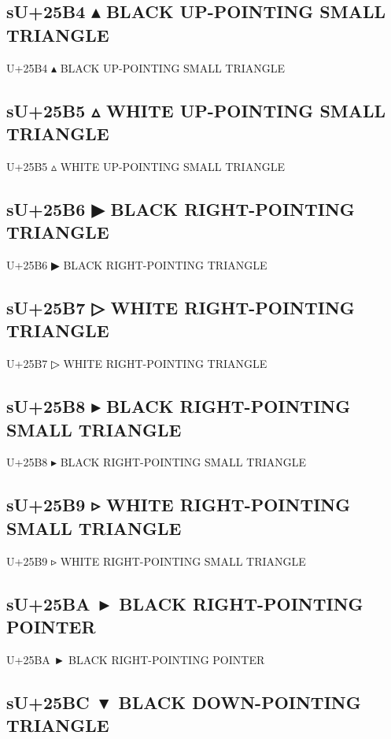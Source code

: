 \subsection{sU+25B4 ▴ BLACK UP-POINTING SMALL TRIANGLE}

U+25B4 ▴ BLACK UP-POINTING SMALL TRIANGLE

\subsection{sU+25B5 ▵ WHITE UP-POINTING SMALL TRIANGLE}

U+25B5 ▵ WHITE UP-POINTING SMALL TRIANGLE

\subsection{sU+25B6 ▶ BLACK RIGHT-POINTING TRIANGLE}

U+25B6 ▶ BLACK RIGHT-POINTING TRIANGLE

\subsection{sU+25B7 ▷ WHITE RIGHT-POINTING TRIANGLE}

U+25B7 ▷ WHITE RIGHT-POINTING TRIANGLE

\subsection{sU+25B8 ▸ BLACK RIGHT-POINTING SMALL TRIANGLE}

U+25B8 ▸ BLACK RIGHT-POINTING SMALL TRIANGLE

\subsection{sU+25B9 ▹ WHITE RIGHT-POINTING SMALL TRIANGLE}

U+25B9 ▹ WHITE RIGHT-POINTING SMALL TRIANGLE

\subsection{sU+25BA ► BLACK RIGHT-POINTING POINTER}

U+25BA ► BLACK RIGHT-POINTING POINTER

\subsection{sU+25BC ▼ BLACK DOWN-POINTING TRIANGLE}

